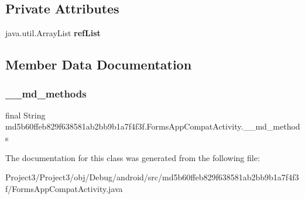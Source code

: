 \subsection*{Private Attributes}
\begin{DoxyCompactItemize}
\item 
\mbox{\label{classmd5b60ffeb829f638581ab2bb9b1a7f4f3f_1_1FormsAppCompatActivity_a3c2387fd0251d4204c05843857d67c60}} 
java.\+util.\+Array\+List {\bfseries ref\+List}
\end{DoxyCompactItemize}


\subsection{Member Data Documentation}
\mbox{\label{classmd5b60ffeb829f638581ab2bb9b1a7f4f3f_1_1FormsAppCompatActivity_a2cb4fae3ad0f7b38c85c94c344df5089}} 
\subsubsection{\texorpdfstring{\+\_\+\+\_\+md\+\_\+methods}{\_\_md\_methods}}
{\footnotesize\ttfamily final String md5b60ffeb829f638581ab2bb9b1a7f4f3f.\+Forms\+App\+Compat\+Activity.\+\_\+\+\_\+md\+\_\+methods\hspace{0.3cm}{\ttfamily [static]}}



The documentation for this class was generated from the following file\+:\begin{DoxyCompactItemize}
\item 
Project3/\+Project3/obj/\+Debug/android/src/md5b60ffeb829f638581ab2bb9b1a7f4f3f/Forms\+App\+Compat\+Activity.\+java\end{DoxyCompactItemize}
